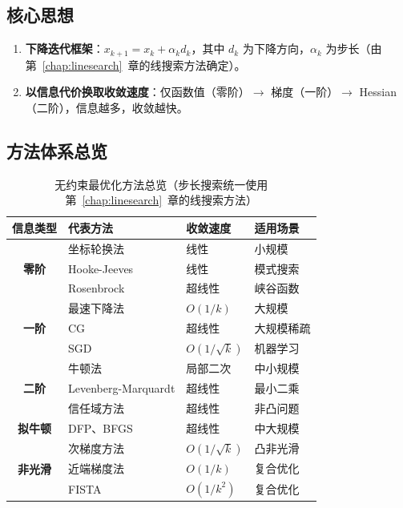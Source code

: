 \subsection{核心思想}

\begin{conceptbox}[多维无约束优化的两大支柱]
\begin{enumerate}[label=\arabic*., leftmargin=2em]
    \item \textbf{下降迭代框架}：$x_{k+1} = x_k + \alpha_k d_k$，其中 $d_k$ 为下降方向，$\alpha_k$ 为步长（由第~\ref{chap:linesearch}~章的线搜索方法确定）。
    \item \textbf{以信息代价换取收敛速度}：仅函数值（零阶）$\rightarrow$ 梯度（一阶）$\rightarrow$ Hessian（二阶），信息越多，收敛越快。
\end{enumerate}
\end{conceptbox}

\subsection{方法体系总览}

\begin{table}[H]
\centering
\small
\caption{无约束最优化方法总览（步长搜索统一使用第~\ref{chap:linesearch}~章的线搜索方法）}
\setlength{\tabcolsep}{4pt}
\begin{tabular}{@{}c>{\raggedright\arraybackslash}p{3cm}>{\raggedright\arraybackslash}p{2.2cm}>{\raggedright\arraybackslash}p{4cm}@{}}
\toprule
\textbf{信息类型} & \textbf{代表方法} & \textbf{收敛速度} & \textbf{适用场景} \\
\midrule
\multirow{3}{*}{\textbf{零阶}} & 坐标轮换法 & 线性 & 小规模 \\
 & Hooke-Jeeves & 线性 & 模式搜索 \\
 & Rosenbrock & 超线性 & 峡谷函数 \\
\midrule
\multirow{3}{*}{\textbf{一阶}} & 最速下降法 & $O(1/k)$ & 大规模 \\
 & CG & 超线性 & 大规模稀疏 \\
 & SGD & $O(1/\sqrt{k})$ & 机器学习 \\
\midrule
\multirow{3}{*}{\textbf{二阶}} & 牛顿法 & 局部二次 & 中小规模 \\
 & Levenberg-Marquardt & 超线性 & 最小二乘 \\
 & 信任域方法 & 超线性 & 非凸问题 \\
\midrule
\textbf{拟牛顿} & DFP、BFGS & 超线性 & 中大规模 \\
\midrule
\multirow{3}{*}{\textbf{非光滑}} & 次梯度方法 & $O(1/\sqrt{k})$ & 凸非光滑 \\
 & 近端梯度法 & $O(1/k)$ & 复合优化 \\
 & FISTA & $O(1/k^2)$ & 复合优化 \\
\bottomrule
\end{tabular}
\end{table}

